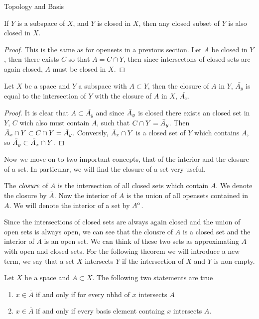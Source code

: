 \begin{chapter}{Topology and Basis}
   \begin{thm}
    If $Y$ is a subspace of $X$, and $Y$ is closed in $X$, then any closed subset of $Y$ is also closed in $X$. 
   \end{thm}

   \begin{proof}
    This is the same as for opensets in a previous section. Let $A$ be closed in $Y$, then there exists $C$ so that 
    $A = C \cap Y$, then since intersectons of closed sets are again closed, $A$ must be closed in $X$.
   \end{proof}

   \begin{thm}
    Let $X$ be a space and $Y$ a subspace with $A \subset Y$, then the closure of $A$ in $Y$, $\bar{A_y}$ is equal to the intersection of $Y$ with the closure of $A$ in $X$, $\bar{A_x }$. 
   \end{thm}

   \begin{proof}
    It is clear that $A \subset \bar{A_y}$ and since $\bar{A}_y$ is closed there exists an closed set in $Y$, $C$ wich also must contain $A$, such that $C \cap Y = \bar{A}_y$. 
    Then $\bar{A}_x \cap Y \subset C \cap Y = \bar{A}_y$. Conversly, $\bar{A}_x \cap Y$ is a closed set of $Y$ which contains $A$, so $\bar{A}_y \subset \bar{A}_x \cap Y$.
   \end{proof}

   Now we move on to two important concepts, that of the interior and the closure of a set. In particular, we will find the closure of a set very useful. 

   \begin{defn}
    The $\emph{closure}$ of $A$ is the intersection of all closed sets which contain $A$. We denote the closure by $\bar{A}$. 
    Now the interior of $A$ is the union of all opensets contained in $A$. We will denote the interior of a set by ${\kern0ptA}^{\mathrm{o}}$. 
   \end{defn}

   Since the intersections of closed sets are always again closed and the union of open sets is always open, we can see that the clousre of $A$ is a closed set and the interior of $A$ is an open set. 
   We can think of these two sets as approximating $A$ with open and closed sets. For the following theorem we will introduce a new term, we say that a set $X$ intersects $Y$ if the intersection of $X$ and $Y$ is non-empty.

   \begin{thm}
    Let $X$ be a space and $A \subset X$. The following two statements are true
    \begin{enumerate}
        \item $x \in \bar{A} $ if and only if for every nbhd of $x$ intersects $A$ 
        \item $x \in \bar{A}$ if and only if every basis element containg $x$ intersects $A$. 
    \end{enumerate}
   \end{thm}


\end{chapter}
